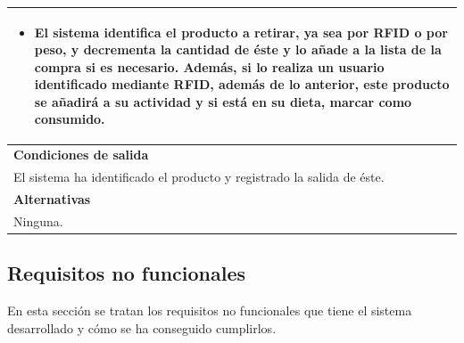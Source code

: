\begin{longtable}{|p{}|}
\begin{itemize}
         \item El sistema identifica el producto a retirar, ya sea por RFID o por peso, y decrementa la cantidad de éste y lo añade a la lista de la compra si es necesario. Además, si lo realiza un usuario identificado mediante RFID, además de lo anterior, este producto se añadirá a su actividad y si está en su dieta, marcar como consumido.
     \end{itemize} \\
     \hline
     \rowcolor[gray]{.9}
     \textbf{Condiciones de salida} \\
     \hline
     El sistema ha identificado el producto y registrado la salida de éste. \\
     \hline
     \rowcolor[gray]{.9}
     \textbf{Alternativas}  \\
     \hline
      Ninguna. \\
     \hline
\end{longtable}

\subsection{Requisitos no funcionales}
En esta sección se tratan los requisitos no funcionales que tiene el sistema desarrollado y cómo se ha conseguido cumplirlos.


